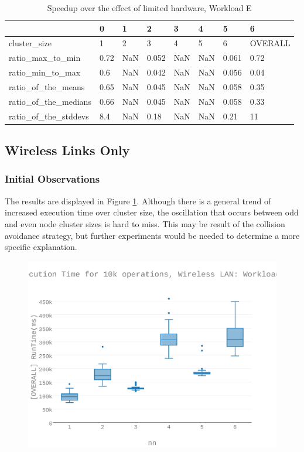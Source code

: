 \begin{table}[H]
\centering
\begin{tabular}{llllllll}
\toprule
{} &    0 &    1 &     2 &    3 &    4 &     5 &        6 \\
\midrule
cluster\_size         &    1 &    2 &     3 &    4 &    5 &     6 &  OVERALL \\
ratio\_max\_to\_min     & 0.72 &  NaN & 0.052 &  NaN &  NaN & 0.061 &     0.72 \\
ratio\_min\_to\_max     &  0.6 &  NaN & 0.042 &  NaN &  NaN & 0.056 &     0.04 \\
ratio\_of\_the\_means   & 0.65 &  NaN & 0.045 &  NaN &  NaN & 0.058 &     0.35 \\
ratio\_of\_the\_medians & 0.66 &  NaN & 0.045 &  NaN &  NaN & 0.058 &     0.33 \\
ratio\_of\_the\_stddevs &  8.4 &  NaN &  0.18 &  NaN &  NaN &  0.21 &       11 \\
\bottomrule
\end{tabular}
\caption{Speedup over the effect of limited hardware, Workload E}
\label{table:rp_v_vm_e_speedup}
\end{table}





\subsection{Wireless Links Only}
\subsubsection{Initial Observations}
The results are displayed in Figure \ref{figures-wle_fig8}.  Although there is a general trend of increased execution time over cluster size, the oscillation that occurs between odd and even node cluster sizes is hard to miss. This may be result of the collision avoidance strategy, but further experiments would be needed to determine a more specific explanation. \begin{figure}[h]
\includegraphics[width=5.5in]{Figures/figures-wle_fig8.pdf}
\caption{}
\label{figures-wle_fig8}
\end{figure}



